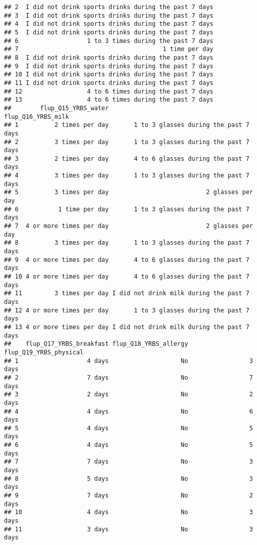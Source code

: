 \documentclass[]{article}
\begin{document}
\begin{verbatim}
## 2  I did not drink sports drinks during the past 7 days
## 3  I did not drink sports drinks during the past 7 days
## 4  I did not drink sports drinks during the past 7 days
## 5  I did not drink sports drinks during the past 7 days
## 6                   1 to 3 times during the past 7 days
## 7                                        1 time per day
## 8  I did not drink sports drinks during the past 7 days
## 9  I did not drink sports drinks during the past 7 days
## 10 I did not drink sports drinks during the past 7 days
## 11 I did not drink sports drinks during the past 7 days
## 12                  4 to 6 times during the past 7 days
## 13                  4 to 6 times during the past 7 days
##        flup_Q15_YRBS_water                          flup_Q16_YRBS_milk
## 1          2 times per day       1 to 3 glasses during the past 7 days
## 2          3 times per day       1 to 3 glasses during the past 7 days
## 3          2 times per day       4 to 6 glasses during the past 7 days
## 4          3 times per day       1 to 3 glasses during the past 7 days
## 5          3 times per day                           2 glasses per day
## 6           1 time per day       1 to 3 glasses during the past 7 days
## 7  4 or more times per day                           2 glasses per day
## 8          3 times per day       1 to 3 glasses during the past 7 days
## 9  4 or more times per day       4 to 6 glasses during the past 7 days
## 10 4 or more times per day       4 to 6 glasses during the past 7 days
## 11         3 times per day I did not drink milk during the past 7 days
## 12 4 or more times per day       1 to 3 glasses during the past 7 days
## 13 4 or more times per day I did not drink milk during the past 7 days
##    flup_Q17_YRBS_breakfast flup_Q18_YRBS_allergy flup_Q19_YRBS_physical
## 1                   4 days                    No                 3 days
## 2                   7 days                    No                 7 days
## 3                   2 days                    No                 2 days
## 4                   4 days                    No                 6 days
## 5                   4 days                    No                 5 days
## 6                   4 days                    No                 5 days
## 7                   7 days                    No                 3 days
## 8                   5 days                    No                 3 days
## 9                   7 days                    No                 2 days
## 10                  4 days                    No                 3 days
## 11                  3 days                    No                 3 days

\end{verbatim}
\end{document}
